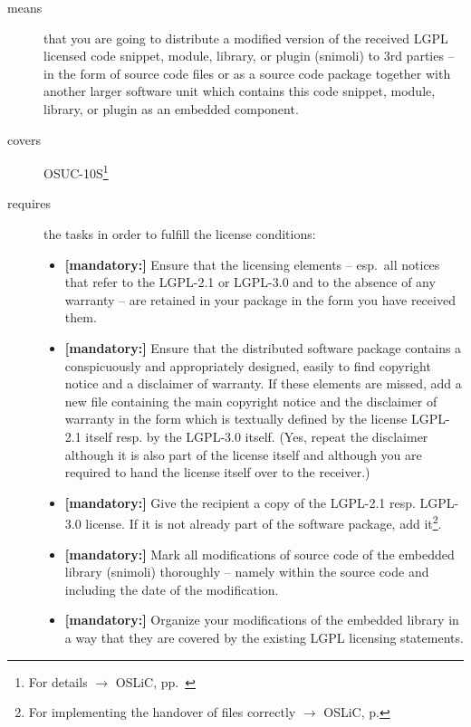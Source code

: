 \begin{description}
\item[means] that you are going to distribute a modified version of the received
LGPL licensed code snippet, module, library, or plugin (snimoli) to 3rd parties
-- in the form of source code files or as a source code package together with
another larger software unit which contains this code snippet, module, library,
or plugin as an embedded component.
\item[covers] OSUC-10S\footnote{For details $\rightarrow$ OSLiC, pp.\
\pageref{OSUC-10S-DEF}}
\item[requires] the tasks in order to fulfill the license conditions:
\begin{itemize}


  \item \textbf{[mandatory:]} Ensure that the licensing elements -- esp.\ all
  notices that refer to the LGPL-2.1 or LGPL-3.0 and to the absence of any
  warranty -- are retained in your package in the form you have received them.

  \item \textbf{[mandatory:]} Ensure that the distributed software package
  contains a conspicuously and appropriately designed, easily to find copyright
  notice and a disclaimer of warranty. If these elements are missed, add a new
  file containing the main copyright notice and the disclaimer of warranty in the
  form which is textually defined by the license LGPL-2.1 itself resp. by the
  LGPL-3.0 itself. (Yes, repeat the disclaimer although it is also part of the
  license itself and although you are required to hand the license itself over
  to the receiver.)
  
  \item \textbf{[mandatory:]} Give the recipient a copy of the LGPL-2.1 resp.
  LGPL-3.0 license. If it is not already part of the software package, add
  it\footnote{For implementing the handover of files correctly $\rightarrow$
  OSLiC, p. \pageref{DistributingFilesHint}}.
    
  \item \textbf{[mandatory:]} Mark all modifications of source code of the
  embedded library (snimoli) thoroughly -- namely within the source code and
  including the date of the modification.
  
  \item \textbf{[mandatory:]} Organize your modifications of the embedded
  library in a way that they are covered by the existing LGPL licensing
  statements. 


\end{itemize}
\end{description}
